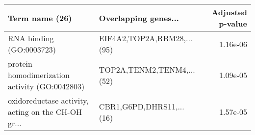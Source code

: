 \begin{tabular}{llr}
\toprule
                                    Term name (26) &       Overlapping genes... &  Adjusted p-value \\
\midrule
                          RNA binding (GO:0003723) & EIF4A2,TOP2A,RBM28,...(95) &          1.16e-06 \\
    protein homodimerization activity (GO:0042803) &  TOP2A,TENM2,TENM4,...(52) &          1.09e-05 \\
oxidoreductase activity, acting on the CH-OH gr... &   CBR1,G6PD,DHRS11,...(16) &          1.57e-05 \\
\bottomrule
\end{tabular}
